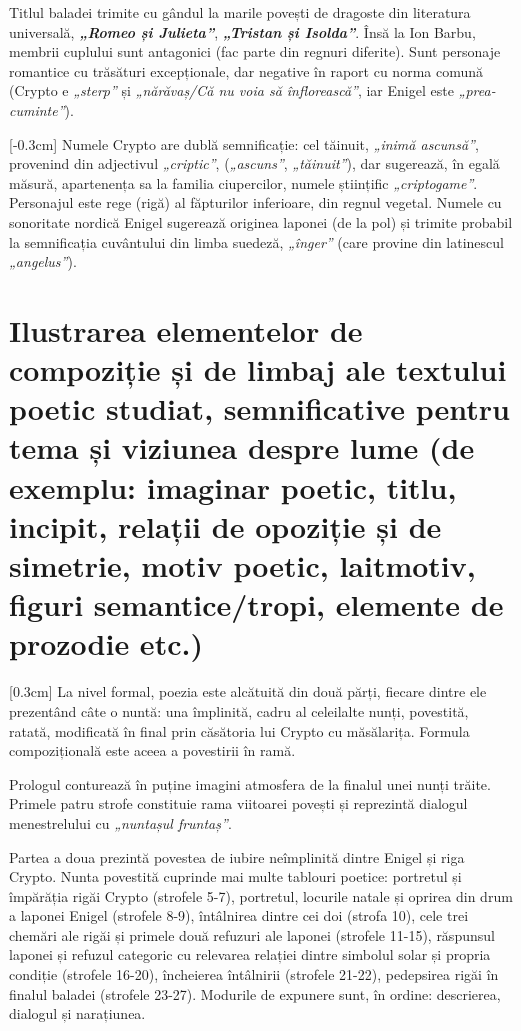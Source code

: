 \documentclass[
12pt,                        %
a4paper                      %
]{article}
\newcommand{\textbfit}[1]{\textbf{\textit{#1}}} %
\newcommand{\operaauthor}{Ion Barbu} %
\begin{document}
Titlul baladei trimite cu gândul la marile povești de dragoste din literatura universală, \textbfit{„Romeo și Julieta”}, \textbfit{„Tristan și Isolda”}. Însă la \operaauthor, membrii cuplului sunt antagonici (fac parte din regnuri diferite). Sunt personaje romantice cu trăsături excepționale, dar negative în raport cu norma comună (Crypto e \textit{„sterp”} și \textit{„nărăvaș/Că nu voia să înflorească”}, iar Enigel este \textit{„prea-cuminte”}).

[-0.3cm]
Numele Crypto are dublă semnificație: cel tăinuit, \textit{„inimă ascunsă”}, provenind din adjectivul \textit{„criptic”}, (\textit{„ascuns”}, \textit{„tăinuit”}), dar sugerează, în egală măsură, apartenența sa la familia ciupercilor, numele științific \textit{„criptogame”}. Personajul este rege (rigă) al făpturilor inferioare, din regnul vegetal. Numele cu sonoritate nordică Enigel sugerează originea laponei (de la pol) și trimite probabil la semnificația cuvântului din limba suedeză, \textit{„înger”} (care provine din latinescul \textit{„angelus”}).

\section{Ilustrarea elementelor de compoziție și de limbaj ale textului poetic studiat, semnificative pentru tema și viziunea despre lume {\footnotesize (de exemplu: imaginar poetic, titlu, incipit, relații de opoziție și de simetrie, motiv poetic, laitmotiv, figuri semantice/tropi, elemente de prozodie etc.)}}

[0.3cm]
La nivel formal, poezia este alcătuită din două părți, fiecare dintre ele prezentând câte o nuntă: una împlinită, cadru al celeilalte nunți, povestită, ratată, modificată în final prin căsătoria lui Crypto cu măsălarița. Formula compozițională este aceea a povestirii în ramă.

Prologul conturează în puține imagini atmosfera de la finalul unei nunți trăite. Primele patru strofe constituie rama viitoarei povești și reprezintă dialogul menestrelului cu \textit{„nuntașul fruntaș”}.

Partea a doua prezintă povestea de iubire neîmplinită dintre Enigel și riga Crypto. Nunta povestită cuprinde mai multe tablouri poetice: portretul și împărăția rigăi Crypto (strofele 5-7), portretul, locurile natale și oprirea din drum a laponei Enigel (strofele 8-9), întâlnirea dintre cei doi (strofa 10), cele trei chemări ale rigăi și primele două refuzuri ale laponei (strofele 11-15), răspunsul laponei și refuzul categoric cu relevarea relației dintre simbolul solar și propria condiție (strofele 16-20), încheierea întâlnirii (strofele 21-22), pedepsirea rigăi în finalul baladei (strofele 23-27). Modurile de expunere sunt, în ordine: descrierea, dialogul și narațiunea.
\end{document}

